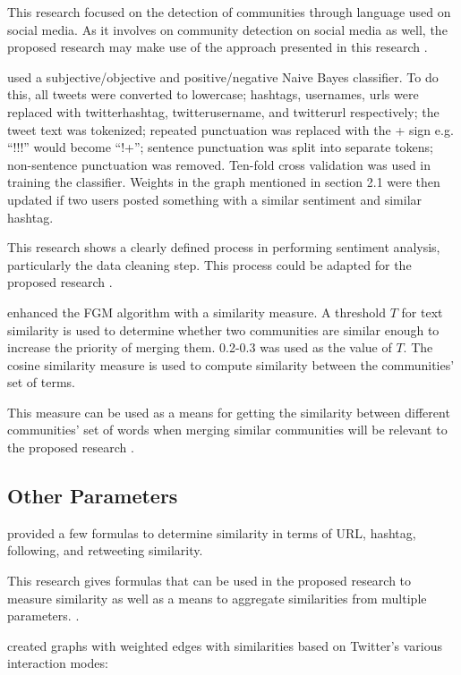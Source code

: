 This research focused on the detection of communities through language used on social media. As it involves on community detection on social media as well, the proposed research may make use of the approach presented in this research \cite{Bryden:2013}.

 used a subjective/objective and positive/negative Naive Bayes classifier. To do this, all tweets were converted to lowercase; hashtags, usernames, urls were replaced with twitterhashtag, twitterusername, and twitterurl respectively; the tweet text was tokenized; repeated punctuation was replaced with the + sign e.g. ``!!!'' would become ``!+''; sentence punctuation was split into separate tokens; non-sentence punctuation was removed. Ten-fold cross validation was used in training the classifier. Weights in the graph mentioned in section 2.1 were then updated if two users posted something with a similar sentiment and similar hashtag. 

This research shows a clearly defined process in performing sentiment analysis, particularly the data cleaning step. This process could be adapted for the proposed research \cite{Deitrick:2013}.

 enhanced the FGM algorithm with a similarity measure. A threshold $T$ for text similarity is used to determine whether two communities are similar enough to increase the priority of merging them. 0.2-0.3 was used as the value of $T$. The cosine similarity measure is used to compute similarity between the communities' set of terms.

This measure can be used as a means for getting the similarity between different communities’ set of words when merging similar communities will be relevant to the proposed research \cite{Bakillah:2014}.

\subsection{Other Parameters}
 provided a few formulas to determine similarity in terms of URL, hashtag, following, and retweeting similarity.

This research gives formulas that can be used in the proposed research to measure similarity as well as a means to aggregate similarities from multiple parameters. \cite{Zhang:2012}. 

 created graphs with weighted edges with similarities based on Twitter's various interaction modes:

